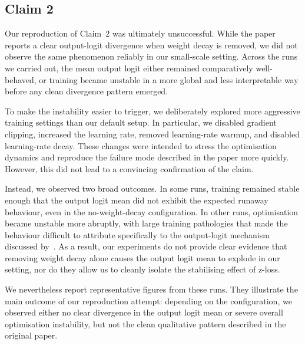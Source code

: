 \subsection{Claim 2}

Our reproduction of Claim~2 was ultimately unsuccessful.
While the paper reports a clear output-logit divergence when weight decay is
removed, we did not observe the same phenomenon reliably in our small-scale
setting.
Across the runs we carried out, the mean output logit either remained
comparatively well-behaved, or training became unstable in a more global and
less interpretable way before any clean divergence pattern emerged.

To make the instability easier to trigger, we deliberately explored more
aggressive training settings than our default setup.
In particular, we disabled gradient clipping, increased the learning rate,
removed learning-rate warmup, and disabled learning-rate decay.
These changes were intended to stress the optimisation dynamics and reproduce
the failure mode described in the paper more quickly.
However, this did not lead to a convincing confirmation of the claim.

Instead, we observed two broad outcomes.
In some runs, training remained stable enough that the output logit mean did
not exhibit the expected runaway behaviour, even in the no-weight-decay
configuration.
In other runs, optimisation became unstable more abruptly, with large training
pathologies that made the behaviour difficult to attribute specifically to the
output-logit mechanism discussed by~\citet{wortsman2023smallscale}.
As a result, our experiments do not provide clear evidence that removing weight
decay alone causes the output logit mean to explode in our setting, nor do they
allow us to cleanly isolate the stabilising effect of z-loss.

We nevertheless report representative figures from these runs.
They illustrate the main outcome of our reproduction attempt: depending on the
configuration, we observed either no clear divergence in the output logit mean
or severe overall optimisation instability, but not the clean qualitative
pattern described in the original paper.

